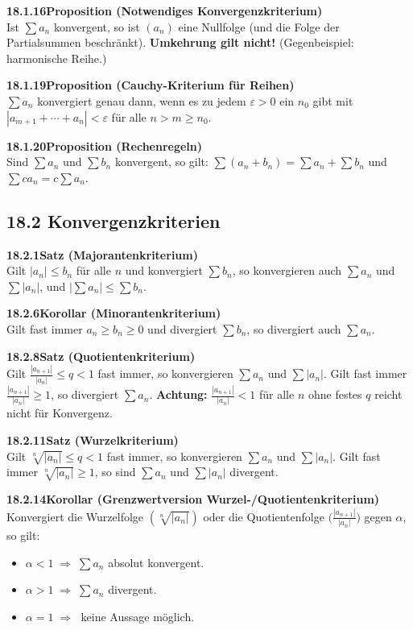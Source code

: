 \documentclass[a4paper,12pt]{article}
\newcommand{\gentry}[3]{%
  \noindent\textbf{#1\quad #2}\nopagebreak\\[0.2em]
  #3\par\smallskip
}
\begin{document}
\gentry{18.1.16}{Proposition (Notwendiges Konvergenzkriterium)}{%
  Ist $\sum a_n$ konvergent, so ist $(a_n)$ eine Nullfolge (und die Folge
  der Partialsummen beschränkt). \textbf{Umkehrung gilt nicht!}
  (Gegenbeispiel: harmonische Reihe.)
}

\gentry{18.1.19}{Proposition (Cauchy-Kriterium für Reihen)}{%
  $\sum a_n$ konvergiert genau dann, wenn es zu jedem $\varepsilon > 0$ ein $n_0$ gibt
  mit $|a_{m+1} + \cdots + a_n| < \varepsilon$ für alle $n > m \ge n_0$.
}

\gentry{18.1.20}{Proposition (Rechenregeln)}{%
  Sind $\sum a_n$ und $\sum b_n$ konvergent, so gilt:
  $\sum(a_n+b_n) = \sum a_n + \sum b_n$ und $\sum ca_n = c\sum a_n$.
}

\subsection*{18.2 \quad Konvergenzkriterien}

\gentry{18.2.1}{Satz (Majorantenkriterium)}{%
  Gilt $|a_n| \le b_n$ für alle $n$ und konvergiert $\sum b_n$, so konvergieren
  auch $\sum a_n$ und $\sum |a_n|$, und $|\sum a_n| \le \sum b_n$.
}

\gentry{18.2.6}{Korollar (Minorantenkriterium)}{%
  Gilt fast immer $a_n \ge b_n \ge 0$ und divergiert $\sum b_n$, so divergiert
  auch $\sum a_n$.
}

\gentry{18.2.8}{Satz (Quotientenkriterium)}{%
  Gilt $\frac{|a_{n+1}|}{|a_n|} \le q < 1$ fast immer, so konvergieren $\sum a_n$
  und $\sum|a_n|$. Gilt fast immer $\frac{|a_{n+1}|}{|a_n|} \ge 1$, so divergiert $\sum a_n$.
  \textbf{Achtung:} $\frac{|a_{n+1}|}{|a_n|} < 1$ für alle $n$ ohne festes $q$
  reicht nicht für Konvergenz.
}

\gentry{18.2.11}{Satz (Wurzelkriterium)}{%
  Gilt $\sqrt[n]{|a_n|} \le q < 1$ fast immer, so konvergieren $\sum a_n$ und
  $\sum|a_n|$. Gilt fast immer $\sqrt[n]{|a_n|} \ge 1$, so sind $\sum a_n$ und
  $\sum|a_n|$ divergent.
}

\gentry{18.2.14}{Korollar (Grenzwertversion Wurzel-/Quotientenkriterium)}{%
  Konvergiert die Wurzelfolge $(\sqrt[n]{|a_n|})$ oder die Quotientenfolge
  $\bigl(\frac{|a_{n+1}|}{|a_n|}\bigr)$ gegen $\alpha$, so gilt:
  \begin{itemize}[topsep=2pt,itemsep=1pt]
    \item $\alpha < 1 \;\Rightarrow\; \sum a_n$ absolut konvergent.
    \item $\alpha > 1 \;\Rightarrow\; \sum a_n$ divergent.
    \item $\alpha = 1 \;\Rightarrow\;$ keine Aussage möglich.
  \end{itemize}
}
\end{document}
